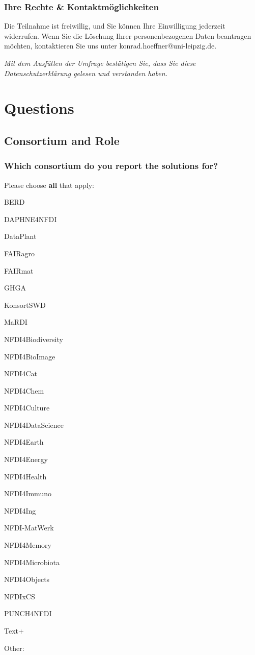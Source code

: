 \documentclass[headsepline,titlepage,twoside,12pt,toc=flat,headings=normal]{scrreprt}
\newcommand{\question}[1]{\subsubsection{#1}}
\newcommand{\otherbox}{\fbox{\phantom{This is how big an answer would be.}}}
\begin{document}
\subsubsection{Ihre Rechte \& Kontaktmöglichkeiten}
Die Teilnahme ist freiwillig, und Sie können Ihre Einwilligung jederzeit widerrufen.
Wenn Sie die Löschung Ihrer personenbezogenen Daten beantragen möchten, kontaktieren Sie uns unter konrad.hoeffner@uni-leipzig.de.

\emph{Mit dem Ausfüllen der Umfrage bestätigen Sie, dass Sie diese Datenschutzerklärung gelesen und verstanden haben.}

\section{Questions}
\subsection{Consortium and Role}\label{consortium-and-role}

\question{Which consortium do you report the solutions for?}

Please choose \textbf{all} that apply:

\begin{answers}
\item BERD
\item DAPHNE4NFDI
\item DataPlant
\item FAIRagro
\item FAIRmat
\item GHGA
\item KonsortSWD
\item MaRDI
\item NFDI4Biodiversity
\item NFDI4BioImage
\item NFDI4Cat
\item NFDI4Chem
\item NFDI4Culture
\item NFDI4DataScience
\item NFDI4Earth
\item NFDI4Energy
\item NFDI4Health
\item NFDI4Immuno
\item NFDI4Ing
\item NFDI-MatWerk
\item NFDI4Memory
\item NFDI4Microbiota
\item NFDI4Objects
\item NFDIxCS
\item PUNCH4NFDI
\item Text+
\item Other: \otherbox

\end{answers}
\end{document}
